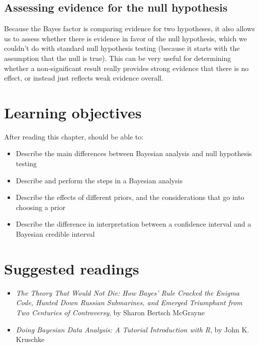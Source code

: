 \documentclass[12pt,]{book}
\providecommand{\tightlist}{%
  \setlength{\itemsep}{0pt}\setlength{\parskip}{0pt}}
\theoremstyle{definition}
\theoremstyle{definition}
\theoremstyle{definition}
\theoremstyle{remark}
\begin{document}
\hypertarget{assessing-evidence-for-the-null-hypothesis}{%
\subsection{Assessing evidence for the null hypothesis}\label{assessing-evidence-for-the-null-hypothesis}}

Because the Bayes factor is comparing evidence for two hypotheses, it also allows us to assess whether there is evidence in favor of the null hypothesis, which we couldn't do with standard null hypothesis testing (because it starts with the assumption that the null is true). This can be very useful for determining whether a non-significant result really provides strong evidence that there is no effect, or instead just reflects weak evidence overall.

\hypertarget{learning-objectives-10}{%
\section{Learning objectives}\label{learning-objectives-10}}

After reading this chapter, should be able to:

\begin{itemize}
\tightlist
\item
  Describe the main differences between Bayesian analysis and null hypothesis testing
\item
  Describe and perform the steps in a Bayesian analysis
\item
  Describe the effects of different priors, and the considerations that go into choosing a prior
\item
  Describe the difference in interpretation between a confidence interval and a Bayesian credible interval
\end{itemize}

\hypertarget{suggested-readings-8}{%
\section{Suggested readings}\label{suggested-readings-8}}

\begin{itemize}
\tightlist
\item
  \emph{The Theory That Would Not Die: How Bayes' Rule Cracked the Enigma Code, Hunted Down Russian Submarines, and Emerged Triumphant from Two Centuries of Controversy}, by Sharon Bertsch McGrayne
\item
  \emph{Doing Bayesian Data Analysis: A Tutorial Introduction with R}, by John K. Kruschke
\end{itemize}
\end{document}
